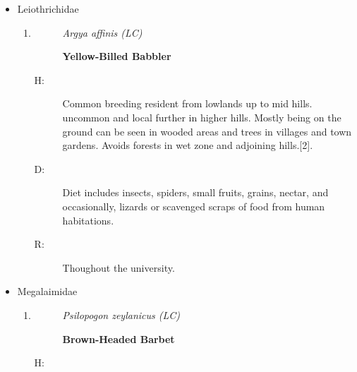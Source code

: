 \begin{itemize}
\begin{enumerate}
\begin{description}
\item[]%
\textbf{Whiskered Tern}%
\end{description}%
\begin{description}%
\item[H: ]%
Common winter migrant to lowlands but rare in the hills. Marshes, tanks, paddyfields, coastal lagoons, salt{-}pans, coastal waters, lakes and rivers are the preferred habitats{[}2{]}.%
\item[D: ]%
Small fish, shrimp, and other marine invertebrates. They hunt by dipping their bills into the water while hovering or flying low over the surface.%
\item[R: ]%
Boat yard and the surrounding areas of Bolgoda lake.%
\end{description}%
\end{enumerate}%
\item%
Leiothrichidae%
\begin{enumerate}%
\item%
\begin{description}%
\item[]%
\textit{Argya affinis (LC)}%
\item[]%
\textbf{Yellow{-}Billed Babbler}%
\end{description}%
\begin{description}%
\item[H: ]%
Common breeding resident from lowlands up to mid hills. uncommon and local further in higher hills. Mostly being on the ground can be seen in wooded areas and trees in villages and town gardens. Avoids forests in wet zone and adjoining hills.{[}2{]}.%
\item[D: ]%
Diet includes insects, spiders, small fruits, grains, nectar, and occasionally, lizards or scavenged scraps of food from human habitations.%
\item[R: ]%
Thoughout the university.%
\end{description}%
\end{enumerate}%
\item%
Megalaimidae%
\begin{enumerate}%
\item%
\begin{description}%
\item[]%
\textit{Psilopogon zeylanicus (LC)}%
\item[]%
\textbf{Brown{-}Headed Barbet}%
\end{description}%
\begin{description}%
\item[H: ]%

\end{description}
\end{enumerate}
\end{itemize}
